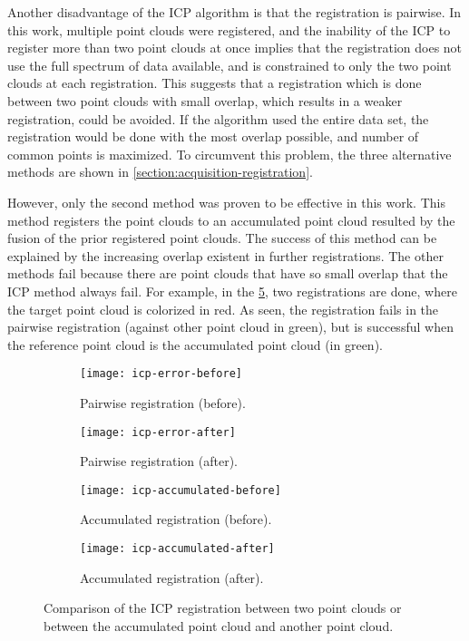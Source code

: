 Another disadvantage of the ICP algorithm is that the registration is pairwise. In this work, multiple point clouds were registered, and the inability of the ICP to register more than two point clouds at once implies that the registration does not use the full spectrum of data available, and is constrained to only the two point clouds at each registration. This suggests that a registration which is done between two point clouds with small overlap, which results in a weaker registration, could be avoided. If the algorithm used the entire data set, the registration would be done with the most overlap possible, and number of common points is maximized. To circumvent this problem, the three alternative methods are shown in \cref{section:acquisition-registration}. 

However, only the second method was proven to be effective in this work. This method registers the point clouds to an accumulated point cloud resulted by the fusion of the prior registered point clouds. The success of this method can be explained by the increasing overlap existent in further registrations. The other methods fail because there are point clouds that have so small overlap that the ICP method always fail. For example, in the \cref{figure:icp-methods}, two registrations are done, where the target point cloud is colorized in red. As seen, the registration fails in the pairwise registration (against other point cloud in green), but is successful when the reference point cloud is the accumulated point cloud (in green).

\begin{figure}[h]
    
    \centering
    \begin{subfigure}[t]{0.5\textwidth}
        \texttt{[image: icp-error-before]}
        \caption{Pairwise registration (before).}
        \label{figure:icp-method-1-wrong}
    \end{subfigure}%
    \begin{subfigure}[t]{0.5\textwidth}
        \texttt{[image: icp-error-after]}
        \caption{Pairwise registration (after).}
        \label{figure:icp-method-1-right}
    \end{subfigure}

    \begin{subfigure}[t]{0.5\textwidth}
        \texttt{[image: icp-accumulated-before]}
        \caption{Accumulated registration (before).}
        \label{figure:icp-method-2-before}
    \end{subfigure}%
    \begin{subfigure}[t]{0.5\textwidth}
        \texttt{[image: icp-accumulated-after]}
        \caption{Accumulated registration (after).}
        \label{figure:icp-method-2-after}
    \end{subfigure}

    \caption{Comparison of the ICP registration between two point clouds or between the accumulated point cloud and another point cloud.}
    \label{figure:icp-methods}

\end{figure}

